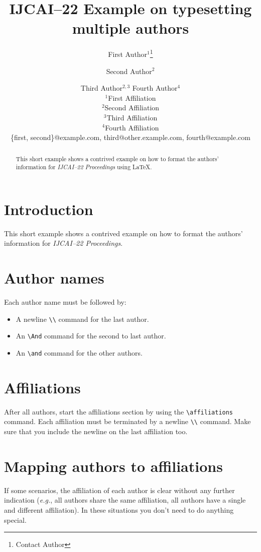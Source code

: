 \documentclass{article}
\title{IJCAI--22 Example on typesetting multiple authors}
\author{
First Author$^1$\footnote{Contact Author}\and
Second Author$^2$\and
Third Author$^{2,3}$\And
Fourth Author$^4$\\
\affiliations
$^1$First Affiliation\\
$^2$Second Affiliation\\
$^3$Third Affiliation\\
$^4$Fourth Affiliation\\
\emails
\{first, second\}@example.com,
third@other.example.com,
fourth@example.com
}
\begin{document}
\maketitle

\begin{abstract}
This short example shows a contrived example on how to format the authors' information for {\it IJCAI--22 Proceedings} using \LaTeX{}.
\end{abstract}

\section{Introduction}

This short example shows a contrived example on how to format the authors' information for {\it IJCAI--22 Proceedings}.

\section{Author names}

Each author name must be followed by:
\begin{itemize}
    \item A newline {\tt \textbackslash{}\textbackslash{}} command for the last author.
    \item An {\tt \textbackslash{}And} command for the second to last author.
    \item An {\tt \textbackslash{}and} command for the other authors.
\end{itemize}

\section{Affiliations}

After all authors, start the affiliations section by using the {\tt \textbackslash{}affiliations} command.
Each affiliation must be terminated by a newline {\tt \textbackslash{}\textbackslash{}} command. Make sure that you include the newline on the last affiliation too.

\section{Mapping authors to affiliations}

If some scenarios, the affiliation of each author is clear without any further indication (\emph{e.g.}, all authors share the same affiliation, all authors have a single and different affiliation). In these situations you don't need to do anything special.
\end{document}
